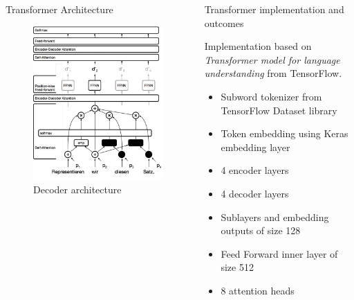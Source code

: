 \documentclass[final]{beamer}
\newlength{\onecolwid}
\newlength{\twocolwid}
\begin{document}
\begin{frame}[t]
\begin{columns}[t]
\begin{column}{\twocolwid}
\begin{columns}[t,totalwidth=\twocolwid]
\begin{column}{\onecolwid}
\begin{block}{Transformer Architecture}
    \begin{figure}
    \includegraphics[clip,scale=0.78]{transformer3.png}
    \caption{Decoder architecture}
    \end{figure}

\end{block}

\end{column} %
\begin{column}{\onecolwid}\vspace{-.6in} %

\begin{block}{Transformer implementation and outcomes}

Implementation based on \textit{Transformer model for language understanding} from TensorFlow. 

\begin{itemize} 
	\item Subword tokenizer from TensorFlow Dataset library
	\item Token embedding using Keras embedding layer
	\item 4 encoder layers
	\item 4 decoder layers
	\item Sublayers and embedding outputs of size 128
	\item Feed Forward inner layer of size 512
	\item 8 attention heads
	\end{itemize}


\end{block}
\end{column}
\end{columns}
\end{column}
\end{columns}
\end{frame}
\end{document}
